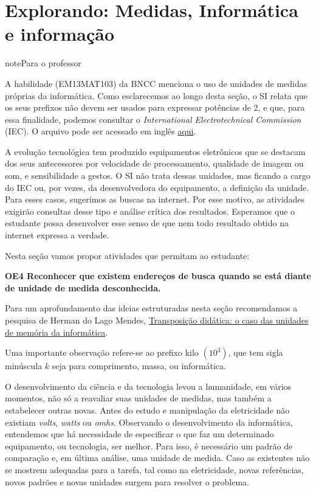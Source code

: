 \section{Explorando: Medidas, Informática e informação}
\label{\detokenize{NO103-1:explorando-medidas-informatica-e-informacao}}\label{\detokenize{NO103-1::doc}}
\begin{sphinxadmonition}{note}{Para o professor}

A habilidade (EM13MAT103) da BNCC menciona o uso de unidades de medidas próprias da informática. Como esclarecemos ao longo desta seção, o SI relata que os seus prefixos não devem ser usados para expressar potências de 2, e que, para essa finalidade, podemos consultar o \textit{International Electrotechnical Commission} (IEC). O arquivo pode ser acessado em inglês \href{https://www.iec.ch/tcnews/archives/pdf/tclet6.pdf}{aqui}.

A evolução tecnológica tem produzido equipamentos eletrônicos que se destacam dos seus antecessores por velocidade de processamento, qualidade de imagem ou som, e sensibilidade a gestos. O SI não trata dessas unidades, mas ficando a cargo do IEC ou, por vezes, da desenvolvedora do equipamento, a definição da unidade. Para esses casos, sugerimos as buscas na internet. Por esse motivo, as atividades exigirão consultas desse tipo e análise crítica dos resultados. Esperamos que o estudante possa desenvolver esse senso de que nem todo resultado obtido na internet expressa a verdade.

Nesta seção vamos propor atividades que permitam ao estudante:

\textbf{OE4 Reconhecer que existem endereços de busca quando se está diante de unidade de medida desconhecida.}

Para um aprofundamento das ideias estruturadas nesta seção recomendamos a pesquisa de Herman do Lago Mendes, \href{https://periodicos.ufsc.br/index.php/revemat/article/view/1981-1322.2016v11n2p156}{Transposição didática: o caso das unidades de memória da informática}.

Uma importante observação refere-se ao prefixo kilo \((10^3)\), que tem sigla minúscula \(k\) seja para comprimento, massa, ou informática.
\end{sphinxadmonition}

O desenvolvimento da ciência e da tecnologia levou a humanidade, em vários momentos, não só a reavaliar suas unidades de medidas, mas também a estabelecer outras novas. Antes do estudo e manipulação da eletricidade não existiam \textit{volts}, \textit{watts} ou \textit{omhs}. Observando o desenvolvimento da informática, entendemos que há necessidade de especificar o que faz um determinado equipamento, ou tecnologia, ser melhor. Para isso, é necessário um padrão de comparação e, em última análise, uma unidade de medida. Caso as existentes não se mostrem adequadas para a tarefa, tal como na eletricidade, novas referências, novos padrões e novas unidades surgem para resolver o problema.

